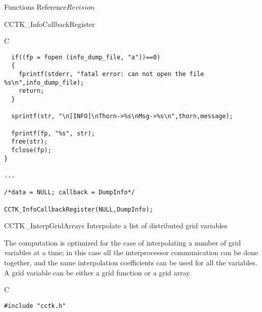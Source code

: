 \begin{cactuspart}{ Functions Reference}{}{$Revision$}
\begin{FunctionDescription}{CCTK\_InfoCallbackRegister}
\begin{ExampleSection}
\begin{Example}{C}
\begin{verbatim}
  if((fp = fopen (info_dump_file, "a"))==0)
  {
    fprintf(stderr, "fatal error: can not open the file %s\n",info_dump_file);
    return;
  }

  sprintf(str, "\n[INFO]\nThorn->%s\nMsg->%s\n",thorn,message);

  fprintf(fp, "%s", str);
  free(str);
  fclose(fp);
}

...

/*data = NULL; callback = DumpInfo*/

CCTK_InfoCallbackRegister(NULL,DumpInfo);
\end{verbatim}
\end{Example}
\end{ExampleSection}
\end{FunctionDescription}


\begin{FunctionDescription}{CCTK\_InterpGridArrays}
\label{CCTK-InterpGridArrays}
Interpolate a list of distributed grid variables

The computation is optimized for the case of interpolating a
number of grid variables at a time; in this case all the interprocessor
communication can be done together, and the same interpolation
coefficients can be used for all the variables.  A grid variable can
be either a grid function or a grid array.

\begin{SynopsisSection}
\begin{Synopsis}{C}
\begin{verbatim}
#include "cctk.h"


\end{verbatim}
\end{Synopsis}
\end{SynopsisSection}
\end{FunctionDescription}
\end{cactuspart}

